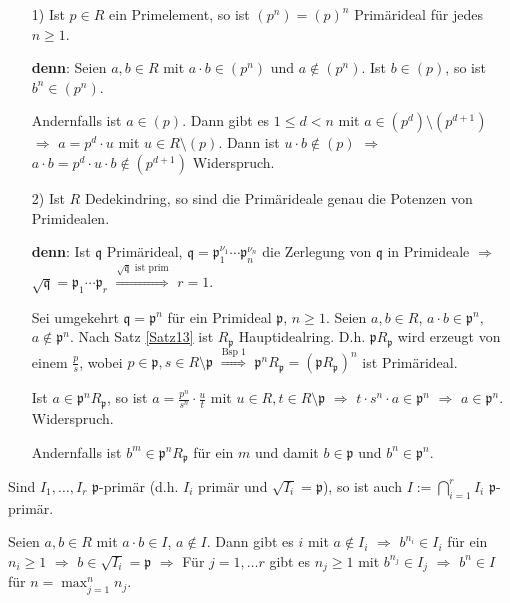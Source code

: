 \documentclass[a4paper, 10pt]{report}
\begin{document}
\begin{nnBsp}
\begin{enumerate}
\item[1)] Ist $p \in R$ ein Primelement, so ist $(p^n) = (p)^n$ Primärideal für jedes $n \geq 1$.

\textbf{denn}: Seien $a, b \in R$ mit $a \cdot b \in (p^n)$ und $a \notin (p^n)$. Ist $b \in (p)$, so ist $b^n \in (p^n)$.

Andernfalls ist $a \in (p)$. Dann gibt es $1 \leq d < n$ mit $a \in (p^d) \setminus (p^{d+1})$ $\Rightarrow$ $a = p^d \cdot u$ mit $u \in R \setminus (p)$. Dann ist $u \cdot b \notin (p)$ $\Rightarrow$ $a \cdot b = p^d \cdot u \cdot b \notin (p^{d+1})$ Widerspruch.

\item[2)] Ist $R$ Dedekindring, so sind die Primärideale genau die Potenzen von Primidealen.

\textbf{denn}: Ist $\mathfrak{q}$ Primärideal, $\mathfrak{q} = \mathfrak{p}_1^{\nu_1} \cdots \mathfrak{p}_n^{\nu_n}$ die Zerlegung von $\mathfrak{q}$ in Primideale $\Rightarrow$ $\sqrt{\mathfrak{q}} = \mathfrak{p}_1 \cdots \mathfrak{p}_r$ $\overset{\sqrt{\mathfrak{q}}\text{ ist prim}}\Rightarrow$ $r=1$.

Sei umgekehrt $\mathfrak{q} = \mathfrak{p}^n$ für ein Primideal $\mathfrak{p}$, $n \geq 1$. Seien $a, b \in R$, $a \cdot b \in \mathfrak{p}^n$, $a \notin \mathfrak{p}^n$. Nach Satz \ref{Satz13} ist $R_\mathfrak{p}$ Hauptidealring. D.h. $\mathfrak{p} R_\mathfrak{p}$ wird erzeugt von einem $\frac{p}{s}$, wobei $p \in \mathfrak{p}, s \in R \setminus \mathfrak{p}$ $\overset{\text{Bsp 1}}\Rightarrow$ $\mathfrak{p}^n R_\mathfrak{p} = (\mathfrak{p} R_\mathfrak{p})^n$ ist Primärideal.

Ist $a \in \mathfrak{p}^n R_\mathfrak{p}$, so ist $a = \frac{p^n}{s^n} \cdot \frac{u}{t}$ mit $u \in R, t \in R \setminus \mathfrak{p}$ $\Rightarrow$ $t \cdot s^n \cdot a \in \mathfrak{p}^n$ $\Rightarrow$ $a \in \mathfrak{p}^n$. Widerspruch.

Andernfalls ist $b^m \in \mathfrak{p}^n R_\mathfrak{p}$ für ein $m$ und damit $b \in \mathfrak{p}$ und $b^n \in \mathfrak{p}^n$.

\end{enumerate}
\end{nnBsp}

\begin{Bem}
Sind $I_1, \ldots, I_r$ $\mathfrak{p}$-primär (d.h. $I_i$ primär und $\sqrt{I_i} = \mathfrak{p}$), so ist auch $I := \displaystyle\bigcap_{i=1}^{r} I_i$ $\mathfrak{p}$-primär.

\begin{Bew}
Seien $a,b \in R$ mit $a \cdot b \in I$, $a \notin I$. Dann gibt es $i$ mit $a \notin I_i$ $\Rightarrow$ $b^{n_i} \in I_i$ für ein $n_i \geq 1$ $\Rightarrow$ $b \in \sqrt{I_i} = \mathfrak{p}$ $\Rightarrow$ Für $j = 1, \ldots r$ gibt es $n_j \geq 1$ mit $b^{n_j} \in I_j$ $\Rightarrow$ $b^n \in I$ für $n = \max_{j=1}^{n} n_j$.

\end{Bew}
\end{Bem}
\end{document}
